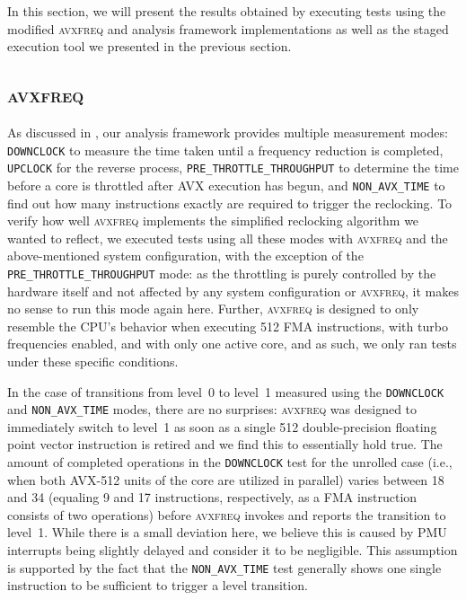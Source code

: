 In this section, we will present the results obtained by executing tests using the modified \textsc{avxfreq} and analysis framework implementations as well as the staged execution tool we presented in the previous section.

\subsection{\textsc{avxfreq}}
\label{sec:evaluation:results:avxfreq}

As discussed in , our analysis framework provides multiple measurement modes: \texttt{DOWNCLOCK} to measure the time taken until a frequency reduction is completed, \texttt{UPCLOCK} for the reverse process, \texttt{PRE\_THROTTLE\_THROUGHPUT} to determine the time before a core is throttled after \gls{AVX} execution has begun, and \texttt{NON\_AVX\_TIME} to find out how many instructions exactly are required to trigger the reclocking. To verify how well \textsc{avxfreq} implements the simplified reclocking algorithm we wanted to reflect, we executed tests using all these modes with \textsc{avxfreq} and the above-mentioned system configuration, with the exception of the \texttt{PRE\_THROTTLE\_THROUGHPUT} mode: as the throttling is purely controlled by the hardware itself and not affected by any system configuration or \textsc{avxfreq}, it makes no sense to run this mode again here. Further, \textsc{avxfreq} is designed to only resemble the \gls{CPU}'s behavior when executing \SI{512}{\bit} \gls{FMA} instructions, with turbo frequencies enabled, and with only one active core, and as such, we only ran tests under these specific conditions.

In the case of transitions from level~0 to level~1 measured using the \texttt{DOWNCLOCK} and \texttt{NON\_AVX\_TIME} modes, there are no surprises: \textsc{avxfreq} was designed to immediately switch to level~1 as soon as a single \SI{512}{\bit} double-precision floating point vector instruction is retired and we find this to essentially hold true. The amount of completed operations in the \texttt{DOWNCLOCK} test for the unrolled case (i.e., when both \gls{AVX-512} units of the core are utilized in parallel) varies between 18 and 34 (equaling 9 and 17 instructions, respectively, as a \gls{FMA} instruction consists of two operations) before \textsc{avxfreq} invokes and reports the transition to level~1. While there is a small deviation here, we believe this is caused by \gls{PMU} interrupts being slightly delayed and consider it to be negligible. This assumption is supported by the fact that the \texttt{NON\_AVX\_TIME} test generally shows one single instruction to be sufficient to trigger a level transition.

